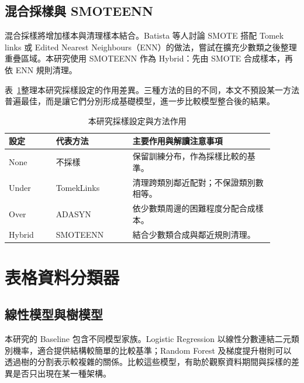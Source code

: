 \subsection{混合採樣與 SMOTEENN}

混合採樣將增加樣本與清理樣本結合。Batista 等人\autocite{batista2004balancing}討論 SMOTE 搭配 Tomek links 或 Edited Nearest Neighbours（ENN）的做法，嘗試在擴充少數類之後整理重疊區域。本研究使用 SMOTEENN 作為 Hybrid：先由 SMOTE 合成樣本，再依 ENN 規則清理。

表~\ref{tab:lit-sampling}整理本研究採樣設定的作用差異。三種方法的目的不同，本文不預設某一方法普遍最佳，而是讓它們分別形成基礎模型，進一步比較模型整合後的結果。

\begin{table}[htbp]
\centering\small
{}\setlength{\tabcolsep}{4pt}
\caption{本研究採樣設定與方法作用}\label{tab:lit-sampling}
\begin{tabular}{@{}>{\raggedright\arraybackslash}p{0.16\linewidth}>{\raggedright\arraybackslash}p{0.26\linewidth}>{\raggedright\arraybackslash}p{0.48\linewidth}@{}}
\toprule
設定 & 代表方法 & 主要作用與解讀注意事項 \\
\midrule
None & 不採樣 & 保留訓練分布，作為採樣比較的基準。 \\[4pt]
Under & TomekLinks & 清理跨類別鄰近配對；不保證類別數相等。 \\[4pt]
Over & ADASYN & 依少數類周邊的困難程度分配合成樣本。 \\[4pt]
Hybrid & SMOTEENN & 結合少數類合成與鄰近規則清理。 \\
\bottomrule
\end{tabular}
\par{}
\end{table}

\section{表格資料分類器}

\subsection{線性模型與樹模型}

本研究的 Baseline 包含不同模型家族。Logistic Regression 以線性分數連結二元類別機率，適合提供結構較簡單的比較基準；Random Forest 及梯度提升樹則可以透過樹的分割表示較複雜的關係。比較這些模型，有助於觀察資料期間與採樣的差異是否只出現在某一種架構。

